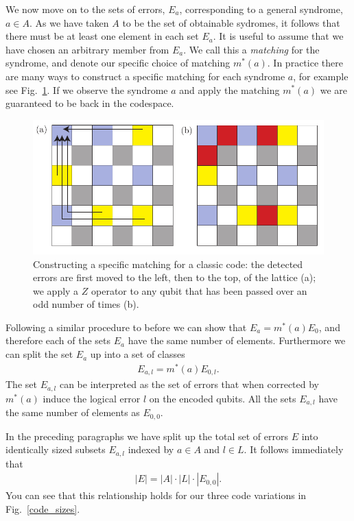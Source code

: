 We now move on to the sets of errors, $E_a$, corresponding to a general syndrome, $a \in A$. As we have taken $A$ to be the set of obtainable sydromes, it follows that there must be at least one element in each set $E_a$. It is useful to assume that we have chosen an arbitrary member from $E_a$. We call this a \textit{matching} for the syndrome, and denote our specific choice of matching $m^*(a)$. In practice there are many ways to construct a specific matching for each syndrome $a$, for example see Fig.~\ref{matching}. If we observe the syndrome $a$ and apply the matching $m^*(a)$ we are guaranteed to be back in the codespace.

\begin{figure}[htb]
  \begin{center}
    \includegraphics{figures/matching.pdf}
  \end{center}
  \caption{Constructing a specific matching for a classic code: the detected errors are first moved to the left, then to the top, of the lattice (a); we apply a $Z$ operator to any qubit that has been passed over an odd number of times (b).}
  \label{matching}
\end{figure}

Following a similar procedure to before we can show that $E_a = m^*(a) E_0$, and therefore each of the sets $E_a$ have the same number of elements. Furthermore we can split the set $E_a$ up into a set of classes
\begin{align}
  E_{a,l} = m^*(a) E_{0, l}.
\end{align}
The set $E_{a,l}$ can be interpreted as the set of errors that when corrected by $m^*(a)$ induce the logical error $l$ on the encoded qubits. All the sets $E_{a, l}$ have the same number of elements as $E_{0,0}$.

In the preceding paragraphs we have split up the total set of errors $E$ into identically sized subsets $E_{a, l}$ indexed by $a\in A$ and $l\in L$. It follows immediately that
\begin{align}
  |E| = |A| \cdot |L| \cdot |E_{0,0}|.
\end{align}
You can see that this relationship holds for our three code variations in Fig.~\ref{code_sizes}.

